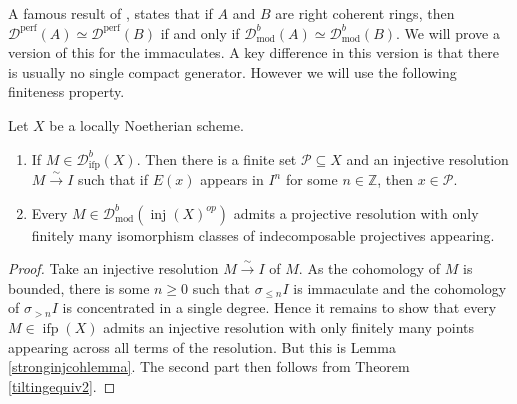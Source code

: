 \documentclass[12pt,oneside]{amsart}
\DeclareMathOperator{\fdmod}{mod}
\DeclareMathOperator{\perf}{perf}
\DeclareMathOperator{\inj}{inj}
\DeclareMathOperator{\ifp}{ifp}
\begin{document}
A famous result of \cite{Ric89}, states that if $A$ and $B$ are right coherent rings, then $\mathcal{D}^{\perf}(A) \simeq \mathcal{D}^{\perf}(B)$ if and only if $\mathcal{D}^b_{\fdmod}(A) \simeq  \mathcal{D}^b_{\fdmod}(B)$. We will prove a version of this for the immaculates. A key difference in this version is that there is usually no single compact generator. However we will use the following finiteness property.



\begin{prop} \label{finitenessprop} \label{finitenesspropcor}
Let $X$ be a locally Noetherian scheme. 

\begin{enumerate}
\item If $M \in \mathcal{D}^b_{\ifp}(X)$. Then there is a finite set $\mathcal{P} 
\subseteq X$ and an injective resolution $M \xrightarrow{\sim} I$ such that if $E(x)$ appears in $I^n$ for some $n \in \mathbb{Z}$, then $x \in \mathcal{P}$. 

\item Every $M \in \mathcal{D}^b_{\fdmod}(\inj(X)^{op})$ admits a projective resolution with only finitely many isomorphism classes of indecomposable projectives appearing.
\end{enumerate}
\end{prop}

\begin{proof}
Take an injective resolution $M \xrightarrow{\sim} I$ of $M$. As the cohomology of $M$ is bounded, there is some $n \geq 0$ such that $\sigma_{\leq n}I$ is immaculate and the cohomology of $\sigma_{>n} I$ is concentrated in a single degree. Hence it remains to show that every $M \in \ifp(X)$ admits an injective resolution with only finitely many points appearing across all terms of the resolution. But this is Lemma \ref{stronginjcohlemma}. The second part then follows from Theorem \ref{tiltingequiv2}.
\end{proof}
\end{document}

